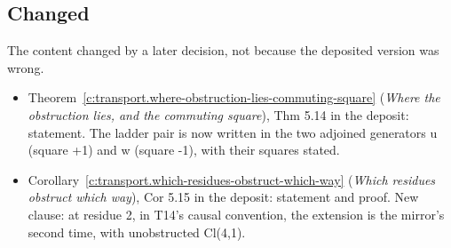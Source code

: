 \documentclass[11pt]{article}
\theoremstyle{definition}
\theoremstyle{plain}
\begin{document}
\subsection*{Changed}
The content changed by a later decision, not because the deposited version was wrong.
\begin{itemize}\setlength{\itemsep}{2pt}
\item Theorem~\ref{c:transport.where-obstruction-lies-commuting-square} (\emph{Where the obstruction lies, and the commuting square}), Thm 5.14 in the deposit: statement. The ladder pair is now written in the two adjoined generators u (square +1) and w (square -1), with their squares stated.
\item Corollary~\ref{c:transport.which-residues-obstruct-which-way} (\emph{Which residues obstruct which way}), Cor 5.15 in the deposit: statement and proof. New clause: at residue 2, in T14's causal convention, the extension is the mirror's second time, with unobstructed Cl(4,1).
\end{itemize}
\end{document}

